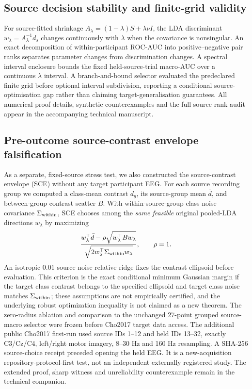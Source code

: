 \documentclass[12pt,a4paper]{article}
\begin{document}
\subsection{Source decision stability and finite-grid validity}
For source-fitted shrinkage $A_\lambda=(1-\lambda)S+\lambda\nu I$,
the LDA discriminant $w_\lambda=A_\lambda^{-1}d_s$
changes continuously with $\lambda$ when the covariance
is nonsingular. An exact decomposition of within-participant
ROC-AUC into positive--negative pair ranks separates
parameter changes from discrimination changes. A spectral
interval enclosure bounds the fixed held-source-trial
macro-AUC over a continuous $\lambda$ interval.
A branch-and-bound selector evaluated the predeclared
finite grid before optional interval subdivision,
reporting a conditional source-optimisation gap rather
than claiming target-generalisation guarantees.
All numerical proof details, synthetic counterexamples
and the full source rank audit appear in the
accompanying technical manuscript.


\subsection{Pre-outcome source-contrast envelope falsification}
\label{sec:v31-brief-method}
As a separate, fixed-source stress test, we also constructed the
source-contrast envelope (SCE) without any target participant EEG.
For each source recording group we computed a class-mean contrast
$d_g$, its source-group mean $\bar d$, and between-group
contrast scatter $B$. With within-source-group class noise
covariance $\Sigma_{\rm within}$, SCE chooses among the
\emph{same feasible} original pooled-LDA directions
$w_\lambda$ by maximizing
\[
 {w_\lambda^\top\bar d-\rho\sqrt{w_\lambda^\top B w_\lambda}
 \over\sqrt{2w_\lambda^\top\Sigma_{\rm within}w_\lambda}},
 \qquad \rho=1.
\]
An isotropic $0.01$ source-noise-relative ridge fixes the
contrast ellipsoid before evaluation. This criterion is the
exact conditional minimum Gaussian margin if the target
class contrast belongs to the specified ellipsoid and target
class noise matches $\Sigma_{\rm within}$; these assumptions
are not empirically certified, and the underlying robust
optimization inequality is not claimed as a new theorem.
The zero-radius ablation and comparison to the unchanged
27-point grouped source-macro selector were frozen
before Cho2017 target data access. The additional
public Cho2017 first-run used source IDs 1--12 and held
IDs 13--32, exactly C3/Cz/C4, left/right motor imagery,
8--30 Hz and 160 Hz resampling. A SHA-256 source-choice
receipt preceded opening the held EEG.
It is a new-acquisition repository-protocol-first test,
not an independent externally registered study.
The extended proof, sharp witness and unreliability
counterexample remain in the technical companion.
\end{document}
